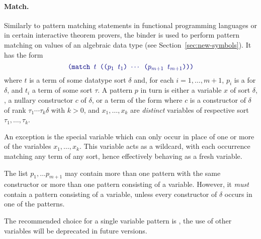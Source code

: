 \paragraph{Match.}
Similarly to pattern matching statements in functional programming languages
or in certain interactive theorem provers,
the  binder is used to perform pattern matching on values 
of an algebraic data type (see Section~\ref{sec:new-symbols}).
It has the form
%
\begin{equation} \label{eq:match}
\expr{(match $t$ (($p_1$ $t_1$) $\cdots$ ($p_{m+1}$ $t_{m+1}$)))}
\end{equation}
%
where $t$ is a term of some datatype sort $\delta$ and,
for each $i=1,\ldots,m+1$,
$p_i$ is a  for $\delta$, and $t_i$ a term of some sort $\tau$.
A pattern $p$ in turn is either a variable $x$ of sort $\delta$, 
,
a nullary constructor $c$ of $\delta$, 
or a term of the form 
where $c$ is a constructor of $\delta$ of rank
$\tau_1\cdots\tau_k\delta$ 
with $k > 0$, and $x_1, \ldots, x_k$ are \emph{distinct} variables 
of respective sort $\tau_1,\ldots,\tau_k$.
\begin{newver}
An exception is the special variable \ter{\_} which can only occur 
in place of one or more of the variables $x_1, \ldots, x_k$.
This variable acts as a wildcard, with each occurrence matching any term
of any sort, hence effectively behaving as a fresh variable.
\end{newver}

The list $p_1,\ldots p_{m+1}$ may contain more than one pattern with the same constructor 
or more than one pattern consisting of a variable.
However, it \emph{must} contain a pattern consisting of a variable,
unless every constructor of $\delta$ occurs in one of the patterns.
\begin{newver}
The recommended choice for a single variable pattern is \ter{\_}, the use of
other variables will be deprecated in future versions.
\end{newver}

